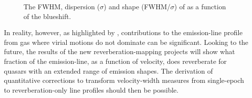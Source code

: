\begin{figure}
    \captionsetup[subfigure]{labelformat=empty}
    \centering 
    \subfloat[\label{fig:line_comparison_civ_a}]{}
    \subfloat[\label{fig:line_comparison_civ_b}]{}
    \subfloat[\label{fig:line_comparison_civ_c}]{}
    \caption{The FWHM, dispersion ($\sigma$) and shape (FWHM/$\sigma$) of  as a function of the  blueshift.}
    \label{fig:line_comparison_civ}
\end{figure} 

In reality, however, as highlighted by \citet{denney12}, contributions to the  emission-line profile from gas where virial motions do not dominate can be significant. 
Looking to the future, the results of the new reverberation-mapping projects \citep{shen15, kingoz15} will show what fraction of the  emission-line, as a function of velocity, does reverberate for quasars with an extended range of  emission shapes. 
The derivation of quantitative corrections to transform velocity-width measures from single-epoch to reverberation-only line profiles should then be possible. 


